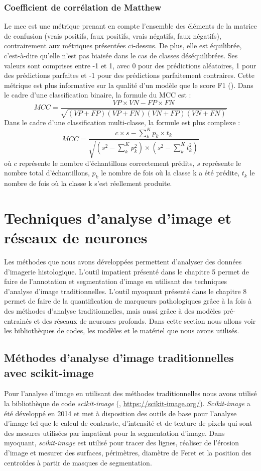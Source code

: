 \subsubsection{Coefficient de corrélation de Matthew}
Le \gls{mcc} est une métrique prenant en compte l'ensemble des éléments de la matrice de confusion (vrais positifs, faux positifs, vrais négatifs, faux négatifs), contrairement aux métriques présentées ci-dessus. De plus, elle est équilibrée, c'est-à-dire qu'elle n'est pas biaisée dans le cas de classes déséquilibrées. Ses valeurs sont comprises entre -1 et 1, avec 0 pour des prédictions aléatoires, 1 pour des prédictions parfaites et -1 pour des prédictions parfaitement contraires. Cette métrique est plus informative sur la qualité d'un modèle que le score F1 (\cite{chicco_advantages_2020}). Dans le cadre d'une classification binaire, la formule du MCC est :
\[ MCC = \frac{VP \times VN - FP \times FN}{\sqrt{(VP + FP)(VP + FN)(VN + FP)(VN + FN)}} \]
Dans le cadre d'une classification multi-classe, la formule est plus complexe :
\[ MCC = \frac{
    c \times s - \sum_{k}^{K} p_k \times t_k
}{\sqrt{
    (s^2 - \sum_{k}^{K} p_k^2) \times
    (s^2 - \sum_{k}^{K} t_k^2)
}} \]
où \(c\) représente le nombre d'échantillons correctement prédits, \(s\) représente le nombre total d'échantillons, \(p_k\) le nombre de fois où la classe k a été prédite, \(t_k\) le nombre de fois où la classe k s'est réellement produite.

\section{Techniques d'analyse d'image et réseaux de neurones}
Les méthodes que nous avons développées permettent d'analyser des données d'imagerie histologique. L'outil \gls{impatient} présenté dans le chapitre 5 permet de faire de l'annotation et segmentation d'image en utilisant des techniques d'analyse d'image traditionnelles. L'outil \gls{myoquant} présenté dans le chapitre 8 permet de faire de la quantification de marqueurs pathologiques grâce à la fois à des méthodes d'analyse traditionnelles, mais aussi grâce à des modèles pré-entrainés et des réseaux de neurones profonds. Dans cette section nous allons voir les bibliothèques de codes, les modèles et le matériel que nous avons utilisés. 

\subsection{Méthodes d'analyse d'image traditionnelles avec scikit-image}
Pour l'analyse d'image en utilisant des méthodes traditionnelles nous avons utilisé la bibliothèque de code \textit{scikit-image} (\cite{walt_scikit-image_2014}, \url{https://scikit-image.org/}). \textit{Scikit-image} a été développé en 2014 et met à disposition des outils de base pour l'analyse d'image tel que le calcul de contraste, d'intensité et de texture de pixels qui sont des mesures utilisées par \gls{impatient} pour la segmentation d'image. Dans \gls{myoquant}, \textit{scikit-image} est utilisé pour tracer des lignes, réaliser de l'érosion d'image et mesurer des surfaces, périmètres, diamètre de Feret et la position des centroïdes à partir de masques de segmentation.


